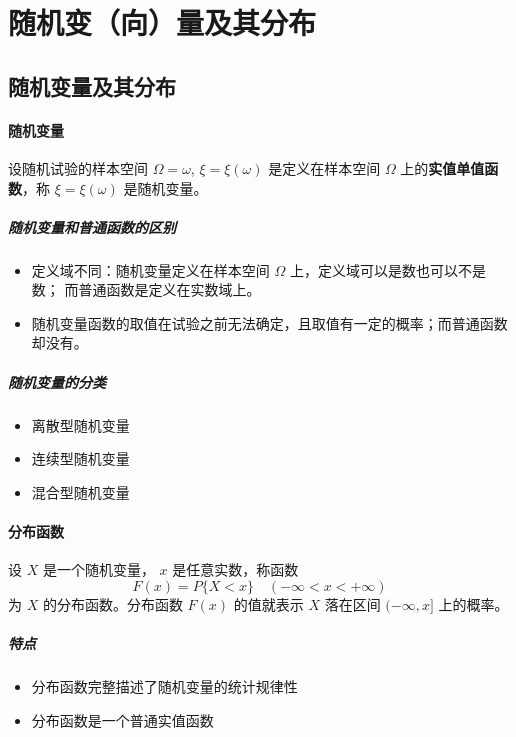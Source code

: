 \section{随机变（向）量及其分布}

\subsection{随机变量及其分布}

\paragraph{随机变量} 设随机试验的样本空间  $ \Omega = {\omega} $, $ \xi = \xi(\omega) $
是定义在样本空间 $ \Omega $ 上的\textbf{实值单值函数}，称 $ \xi = \xi(\omega) $ 是随机变量。

\subparagraph{随机变量和普通函数的区别}
\begin{itemize}[leftmargin=\subparitemindent]
    \item 定义域不同：随机变量定义在样本空间 $ \Omega $ 上，定义域可以是数也可以不是数；
    而普通函数是定义在实数域上。
    \item 随机变量函数的取值在试验之前无法确定，且取值有一定的概率；而普通函数却没有。
\end{itemize}

\subparagraph{随机变量的分类}
\begin{itemize}[leftmargin=\subparitemindent]
    \item 离散型随机变量
    \item 连续型随机变量
    \item 混合型随机变量
\end{itemize}

\paragraph{分布函数} 设 $ X $ 是一个随机变量， $ x $ 是任意实数，称函数 \begin{equation}
    \label{equ:分布函数定义}
    F(x) = P\{X < x\} \quad (-\infty < x < +\infty)
\end{equation}
为 $ X $ 的分布函数。分布函数 $ F(x) $ 的值就表示 $ X $ 落在区间 $ (-\infty,x] $ 上的概率。

\subparagraph{特点} 
\begin{itemize}[leftmargin=\subparitemindent]
    \item 分布函数完整描述了随机变量的统计规律性
    \item 分布函数是一个普通实值函数 
\end{itemize}

